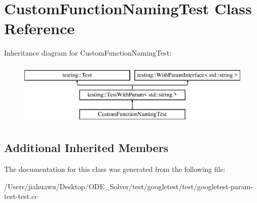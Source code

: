 \hypertarget{class_custom_function_naming_test}{}\section{Custom\+Function\+Naming\+Test Class Reference}
\label{class_custom_function_naming_test}
Inheritance diagram for Custom\+Function\+Naming\+Test\+:\begin{figure}[H]
\begin{center}
\leavevmode
\includegraphics[height=3.000000cm]{class_custom_function_naming_test}
\end{center}
\end{figure}
\subsection*{Additional Inherited Members}


The documentation for this class was generated from the following file\+:\begin{DoxyCompactItemize}
\item 
/\+Users/jiahuawu/\+Desktop/\+O\+D\+E\+\_\+\+Solver/test/googletest/test/googletest-\/param-\/test-\/test.\+cc\end{DoxyCompactItemize}
